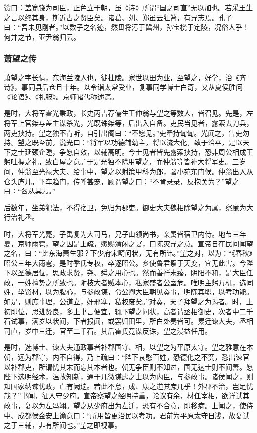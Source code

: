 \documentclass[]{article}
\begin{document}
赞曰：盖宽饶为司臣，正色立于朝，虽《诗》所谓``国之司直''无以加也。若采王生之言以终其身，斯近古之贤臣矣。诸葛、刘、郑虽云狂瞽，有异志焉。孔子曰：``吾未见刚者。''以数子之名迹，然毌将污于冀州，孙宝桡于定陵，况俗人乎！何并之节，亚尹翁归云。

\hypertarget{header-n5513}{%
\subsubsection{萧望之传}\label{header-n5513}}

萧望之字长倩，东海兰陵人也，徙杜陵。家世以田为业，至望之，好学，治《齐诗》，事同县后仓且十年。以令诣太常受业，复事同学博士白奇，又从夏侯胜问《论语》、《礼服》。京师诸儒称述焉。

是时，大将军霍光秉政，长史丙吉荐儒生王仲翁与望之等数人，皆召见。先是，左将军上官桀与盖主谋杀光，光既诛桀等，后出入自备。吏民当见者，露索去刀兵，两吏挟持。望之独不肯听，自引出阁曰：``不愿见。''吏牵持匈匈。光闻之，告吏勿持。望之既至前，说光曰：``将军以功德辅幼主，将以流大化，致于洽平，是以天下之士延颈企踵，争愿自效，以辅高明。今士见者皆先露索挟持，恐非周公相成王躬吐握之礼，致白屋之意。''于是光独不除用望之，而仲翁等皆补大将军史。三岁间，仲翁至光禄大夫、给事中，望之以射策甲科为郎，署小苑东门候。仲翁出入从仓头庐儿，下车趋门，传呼甚宠，顾谓望之曰：``不肯录录，反抱关为？''望之曰：``各从其志。''

后数年，坐弟犯法，不得宿卫，免归为郡吏。御史大夫魏相除望之为属，察廉为大行治礼丞。

时，大将军光薨，子禹复为大司马，兄子山领尚书，亲属皆宿卫内侍。地节三年夏，京师雨雹，望之因是上疏，愿赐清闲之宴，口陈灾异之意。宣帝自在民间闻望之名，曰：``此东海萧生邪？下少府宋畸问状，无有所讳。''望之对，以为：``《春秋》昭公三年大雨雹，是时季氏专权，卒逐昭公。乡使鲁君察于天变，宜无此害。今陛下以圣德居位，思政求贤，尧、舜之用心也。然而善祥未臻，阴阳不和，是大臣任政，一姓擅势之所致也。附枝大者贼本心，私家盛者公室危。唯明主躬万机，选同姓，举贤材，以为腹心，与参政谋，令公卿大臣朝见奏事，明陈其职，以考功能。如是，则庶事理，公道立，奸邪塞，私权废矣。''对奏，天子拜望之为谒者。时，上初即位，思进贤良，多上书言便宜，辄下望之问状，高者请丞相御史，次者中二千石试事，满岁以状闻，下者报闻，或罢归田里，所白处奏皆可。累迁谏大夫，丞相司直，岁中三迁，官至二千石。其后霍氏竟谋反诛，望之浸益任用。

是时，选博士、谏大夫通政事者补郡国守、相，以望之为平原太守。望之雅意在本朝，远为郡守，内不自得，乃上疏曰：``陛下哀愍百姓，恐德化之不究，悉出谏官以补郡吏，所谓忧其末而忘其本者也。朝无争臣则不知过，国无达士则不闻善。愿陛下选明经术，温故知新，通于几微谋虑之士以为内臣，与参政事。诸侯闻之，则知国家纳谏忧政，亡有阙遗。若此不怠，成、康之道其庶几乎！外郡不治，岂足忧哉？''书闻，征入守少府。宣帝察望之经明持重，论议有余，材任宰相，欲详试其政事，复以为左冯翊。望之从少府出为左迁，恐有不合意，即移病。上闻之，使侍中、成都侯金安上谕意曰：``所用皆更治民以考功。君前为平原太守日浅，故复试之于三辅，非有所闻也。''望之即视事。
\end{document}
